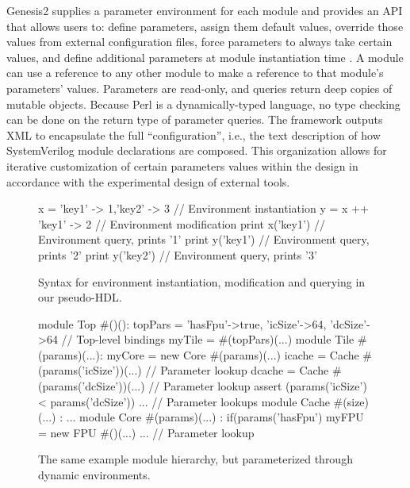 Genesis2 supplies a parameter environment for each module and provides an API that allows users to:
define parameters,
assign them default values,
override those values from external configuration files,
force parameters to always take certain values,
and
define additional parameters at module instantiation time
\cite{shacham2011chip}.
A module can use a reference to any other module to make a reference to that module's parameters' values. 
Parameters are read-only, and queries return deep copies of mutable objects.
Because Perl is a dynamically-typed language, no type checking can be done on the return type of parameter queries.
The framework outputs XML to encapsulate the full ``configuration'', i.e., the text description of how SystemVerilog module declarations are composed.
This organization allows for iterative customization of certain parameters values within the design in accordance with the experimental design of external tools.

\begin{figure}
\centering
\begin{phdl}
x = {'key1' -> 1,'key2' -> 3} // Environment instantiation
y = x ++ {'key1' -> 2}        // Environment modification
print x('key1')               // Environment query, prints '1'
print y('key1')               // Environment query, prints '2'
print y('key2')               // Environment query, prints '3'
\end{phdl}
\caption{Syntax for environment instantiation, modification and querying in our pseudo-HDL.}
\label{fig:env-phdl}
\end{figure}

\begin{figure}
\centering
\begin{phdl}
module Top #()():
  topPars = {'hasFpu'->true, 'icSize'->64, 'dcSize'->64} // Top-level bindings
  myTile = #(topPars)(...)
module Tile #(params)(...):
  myCore = new Core  #(params)(...)
  icache = Cache #(params('icSize'))(...)          // Parameter lookup
  dcache = Cache #(params('dcSize'))(...)          // Parameter lookup
  assert (params('icSize') < params('dcSize')) ... // Parameter lookups
module Cache #(size)(...) : ...
module Core  #(params)(...) :
  if(params('hasFpu') myFPU = new FPU #()(...) ... // Parameter lookup
\end{phdl} 
\caption[Parameterizing the example through dynamic environments.]{
The same example module hierarchy, but parameterized through dynamic environments.}
\label{fig:env}
\end{figure}

